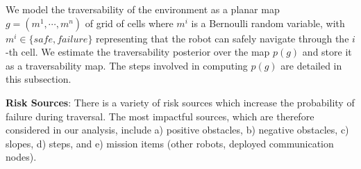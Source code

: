 \documentclass[letterpaper, 10pt, conference]{ieeeconf}      %
\newcommand{\ph}[1]{{\textbf{#1}:}} %
\newcommand{\rev}[1]{{\color{blue} #1 }} %
\begin{document}
We model the traversability of the environment as a \rev{planar} map $g=(m^1,\cdots,m^n)$ of grid of cells where $m^i$ is a Bernoulli random variable, with $m^i \in \{safe,failure\}$ representing that the robot can safely navigate through the $i$-th cell. 
We estimate the traversability posterior over the map $p(g)$ and store it as a traversability map.
The steps involved in computing $p(g)$ are detailed in this subsection.



\ph{Risk Sources}
There is a variety of risk sources which increase the probability of failure during traversal. 
The most impactful sources, which are therefore considered in our analysis, include a) positive obstacles, b) negative obstacles, c) slopes, d) steps, and e) \rev{mission items}(other robots, deployed communication nodes).

\end{document}
